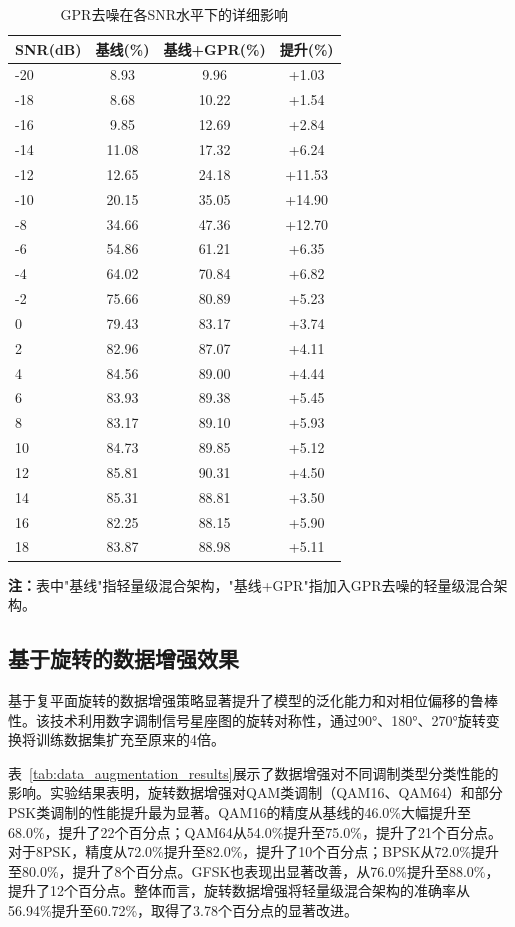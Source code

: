 \documentclass[conference]{IEEEtran}
\begin{document}
\begin{table}[h]
\centering
\caption{GPR去噪在各SNR水平下的详细影响}
\label{tab:gpr_detailed_snr}
\begin{tabular}{@{}lccc@{}}
\toprule
SNR(dB) & 基线(\%) & 基线+GPR(\%) & 提升(\%) \\
\midrule
-20 & 8.93 & 9.96 & +1.03 \\
-18 & 8.68 & 10.22 & +1.54 \\
-16 & 9.85 & 12.69 & +2.84 \\
-14 & 11.08 & 17.32 & +6.24 \\
-12 & 12.65 & 24.18 & +11.53 \\
-10 & 20.15 & 35.05 & +14.90 \\
-8 & 34.66 & 47.36 & +12.70 \\
-6 & 54.86 & 61.21 & +6.35 \\
-4 & 64.02 & 70.84 & +6.82 \\
-2 & 75.66 & 80.89 & +5.23 \\
0 & 79.43 & 83.17 & +3.74 \\
2 & 82.96 & 87.07 & +4.11 \\
4 & 84.56 & 89.00 & +4.44 \\
6 & 83.93 & 89.38 & +5.45 \\
8 & 83.17 & 89.10 & +5.93 \\
10 & 84.73 & 89.85 & +5.12 \\
12 & 85.81 & 90.31 & +4.50 \\
14 & 85.31 & 88.81 & +3.50 \\
16 & 82.25 & 88.15 & +5.90 \\
18 & 83.87 & 88.98 & +5.11 \\
\bottomrule
\end{tabular}
\end{table}

\textbf{注：}表中"基线"指轻量级混合架构，"基线+GPR"指加入GPR去噪的轻量级混合架构。

\subsection{基于旋转的数据增强效果}

基于复平面旋转的数据增强策略显著提升了模型的泛化能力和对相位偏移的鲁棒性。该技术利用数字调制信号星座图的旋转对称性，通过90°、180°、270°旋转变换将训练数据集扩充至原来的4倍。

表~\ref{tab:data_augmentation_results}展示了数据增强对不同调制类型分类性能的影响。实验结果表明，旋转数据增强对QAM类调制（QAM16、QAM64）和部分PSK类调制的性能提升最为显著。QAM16的精度从基线的46.0\%大幅提升至68.0\%，提升了22个百分点；QAM64从54.0\%提升至75.0\%，提升了21个百分点。对于8PSK，精度从72.0\%提升至82.0\%，提升了10个百分点；BPSK从72.0\%提升至80.0\%，提升了8个百分点。GFSK也表现出显著改善，从76.0\%提升至88.0\%，提升了12个百分点。整体而言，旋转数据增强将轻量级混合架构的准确率从56.94\%提升至60.72\%，取得了3.78个百分点的显著改进。
\end{document}
